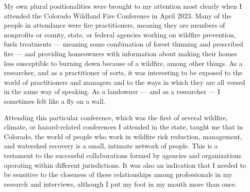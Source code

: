 \documentclass[
]{article}
\begin{document}
My own plural positionalities were brought to my attention most clearly when I attended the Colorado Wildland Fire Conference in April 2023. Many of the people in attendance were fire practitioners, meaning they are members of nonprofits or county, state, or federal agencies working on wildfire prevention, fuels treatments --- meaning some combination of forest thinning and prescribed fire --- and providing homeowners with information about making their homes less susceptible to burning down because of a wildfire, among other things. As a researcher, and as a practitioner of sorts, it was interesting to be exposed to the world of practitioners and managers and to the ways in which they are all versed in the same way of speaking. As a landowner --- and as a researcher --- I sometimes felt like a fly on a wall.

Attending this particular conference, which was the first of several wildfire, climate, or hazard-related conferences I attended in the state, taught me that in Colorado, the world of people who work in wildfire risk reduction, management, and watershed recovery is a small, intimate network of people. This is a testament to the successful collaborations formed by agencies and organizations operating within different jurisdictions. It was also an indication that I needed to be sensitive to the closeness of these relationships among professionals in my research and interviews, although I put my foot in my mouth more than once.
\end{document}
